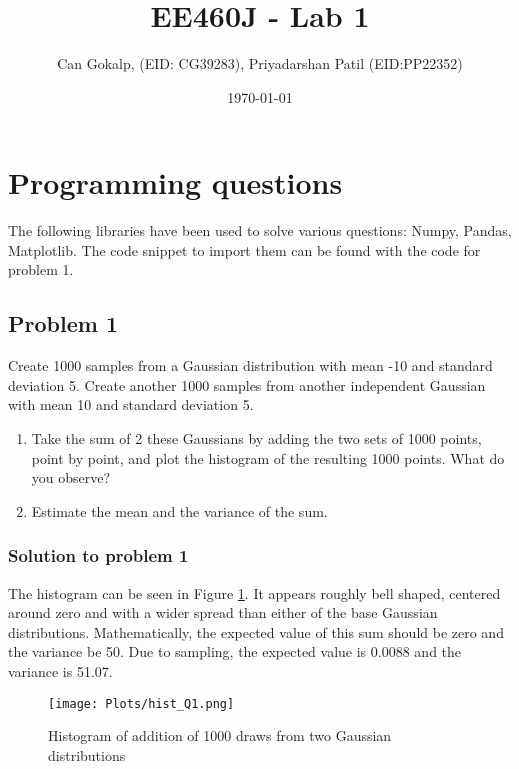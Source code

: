 \documentclass[12pt]{article}%
\begin{document}
\title{EE460J - Lab 1}
\author{Can Gokalp, (EID: CG39283), Priyadarshan Patil (EID:PP22352)}
\date{\today}
\maketitle

\section{Programming questions}

The following libraries have been used to solve various questions: Numpy, Pandas, Matplotlib. The code snippet to import them can be found with the code for problem 1. 

\subsection{Problem 1}

Create 1000 samples from a Gaussian distribution with mean -10 and standard deviation 5. Create another 1000 samples from another independent Gaussian with mean 10 and standard deviation 5. 
\begin{enumerate}
    \item Take the sum of 2 these Gaussians by adding the two sets of 1000 points, point by point, and plot the histogram of the resulting 1000 points. What do you observe?
    \item Estimate the mean and the variance of the sum.
\end{enumerate}


\subsubsection{Solution to problem 1}

The histogram can be seen in Figure \ref{fig:hist_Q1}. It appears roughly bell shaped, centered around zero and with a wider spread than either of the base Gaussian distributions. Mathematically, the expected value of this sum should be zero and the variance be 50. Due to sampling, the expected value is 0.0088 and the variance is 51.07.\\

\begin{figure}[h]
\texttt{[image: Plots/hist\_Q1.png]}
\centering
\caption{Histogram of addition of 1000 draws from two Gaussian distributions}
\label{fig:hist_Q1}
\centering
\end{figure}
\end{document}
